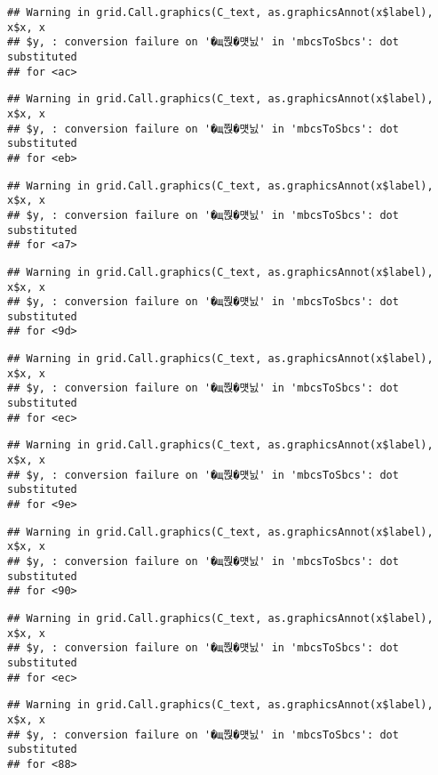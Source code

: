 \documentclass[]{article}
\begin{document}
\begin{verbatim}
## Warning in grid.Call.graphics(C_text, as.graphicsAnnot(x$label), x$x, x
## $y, : conversion failure on '�щ쭩�먯닔' in 'mbcsToSbcs': dot substituted
## for <ac>
\end{verbatim}

\begin{verbatim}
## Warning in grid.Call.graphics(C_text, as.graphicsAnnot(x$label), x$x, x
## $y, : conversion failure on '�щ쭩�먯닔' in 'mbcsToSbcs': dot substituted
## for <eb>
\end{verbatim}

\begin{verbatim}
## Warning in grid.Call.graphics(C_text, as.graphicsAnnot(x$label), x$x, x
## $y, : conversion failure on '�щ쭩�먯닔' in 'mbcsToSbcs': dot substituted
## for <a7>
\end{verbatim}

\begin{verbatim}
## Warning in grid.Call.graphics(C_text, as.graphicsAnnot(x$label), x$x, x
## $y, : conversion failure on '�щ쭩�먯닔' in 'mbcsToSbcs': dot substituted
## for <9d>
\end{verbatim}

\begin{verbatim}
## Warning in grid.Call.graphics(C_text, as.graphicsAnnot(x$label), x$x, x
## $y, : conversion failure on '�щ쭩�먯닔' in 'mbcsToSbcs': dot substituted
## for <ec>
\end{verbatim}

\begin{verbatim}
## Warning in grid.Call.graphics(C_text, as.graphicsAnnot(x$label), x$x, x
## $y, : conversion failure on '�щ쭩�먯닔' in 'mbcsToSbcs': dot substituted
## for <9e>
\end{verbatim}

\begin{verbatim}
## Warning in grid.Call.graphics(C_text, as.graphicsAnnot(x$label), x$x, x
## $y, : conversion failure on '�щ쭩�먯닔' in 'mbcsToSbcs': dot substituted
## for <90>
\end{verbatim}

\begin{verbatim}
## Warning in grid.Call.graphics(C_text, as.graphicsAnnot(x$label), x$x, x
## $y, : conversion failure on '�щ쭩�먯닔' in 'mbcsToSbcs': dot substituted
## for <ec>
\end{verbatim}

\begin{verbatim}
## Warning in grid.Call.graphics(C_text, as.graphicsAnnot(x$label), x$x, x
## $y, : conversion failure on '�щ쭩�먯닔' in 'mbcsToSbcs': dot substituted
## for <88>
\end{verbatim}
\end{document}
